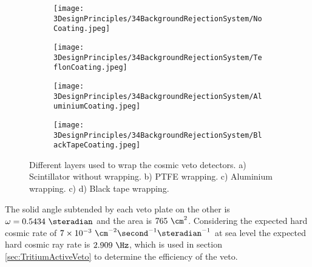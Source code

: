 \begin{figure}[h]
\centering
    \begin{subfigure}[b]{0.23\textwidth}
    \centering
    \texttt{[image: 3DesignPrinciples/34BackgroundRejectionSystem/NoCoating.jpeg]}  
    \caption{\label{subfig:PlasticScintillatorNoCoating}}
    \end{subfigure}
    \hfill
    \begin{subfigure}[b]{0.23\textwidth}
    \centering
    \texttt{[image: 3DesignPrinciples/34BackgroundRejectionSystem/TeflonCoating.jpeg]}  
    \caption{\label{subfig:PlasticScintillatorTeflon}}
    \end{subfigure}
    \hfill
    \begin{subfigure}[b]{0.23\textwidth}
    \centering
    \texttt{[image: 3DesignPrinciples/34BackgroundRejectionSystem/AluminiumCoating.jpeg]}  
    \caption{\label{subfig:PlasticScintillatorAluminium}}
    \end{subfigure}
    \hfill
    \begin{subfigure}[b]{0.23\textwidth}
    \centering
    \texttt{[image: 3DesignPrinciples/34BackgroundRejectionSystem/BlackTapeCoating.jpeg]}  
    \caption{\label{subfig:PlasticScintillatorBlackTape}}
    \end{subfigure}
 \caption{Different layers used to wrap the cosmic veto detectors. a) Scintillator without wrapping. b) PTFE wrapping. c) Aluminium wrapping. c) d) Black tape wrapping.}
 \label{fig:LayersVeto}
\end{figure}

The solid angle subtended by each veto plate on the other is $\omega=0.5434~\steradian$ and the area is $765~\cm^2$. Considering the expected hard cosmic rate of $7 \times 10^{-3}~\cm^{-2}\second^{-1}\steradian^{-1}$ at sea level the expected hard cosmic ray rate is $2.909~\Hz$, which is used in section \ref{sec:TritiumActiveVeto} to determine the efficiency of the veto.